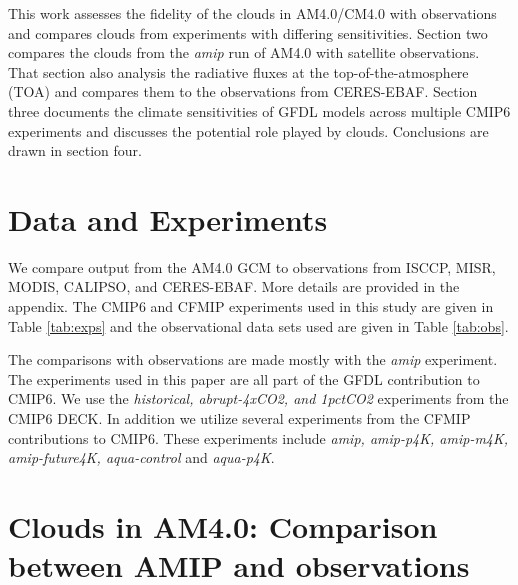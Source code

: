 \documentclass[draft]{agujournal2019}
\begin{document}
This work assesses the fidelity of the clouds in AM4.0/CM4.0 with observations and compares clouds from experiments 
with differing sensitivities. 
Section two compares the clouds from the \textit{amip} run of AM4.0 with satellite observations.  That section also 
analysis the radiative fluxes at the top-of-the-atmosphere (TOA) and compares them to the observations from 
CERES-EBAF.    Section three documents the climate sensitivities of GFDL models across multiple CMIP6 experiments 
and discusses the potential role played by clouds.   Conclusions are drawn in section four.  

\section{Data and Experiments}

We compare output from the AM4.0 GCM to observations from ISCCP, MISR, MODIS, CALIPSO, and CERES-EBAF.
More details are provided in the appendix.  The CMIP6 and CFMIP experiments used in this study are given in Table
\ref{tab:exps} and the observational data sets used are given in Table \ref{tab:obs}.

The comparisons with observations are made mostly with the \textit{amip} experiment.   The experiments used 
in this paper are all part of the GFDL contribution to CMIP6.  We use the \textit{historical, abrupt-4xCO2, and 1pctCO2}
experiments from the CMIP6 DECK.  In addition we utilize several experiments from the CFMIP contributions 
to CMIP6.  These experiments include \textit{amip, amip-p4K, amip-m4K, amip-future4K, aqua-control} and \textit{aqua-p4K}. 



\section{Clouds in AM4.0: Comparison between AMIP and observations}
\end{document}

